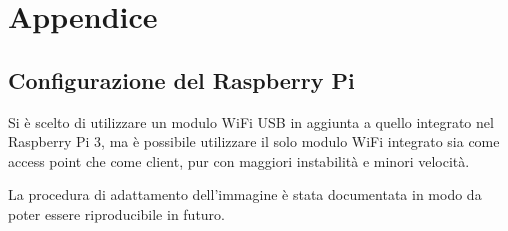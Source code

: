 \appendix

\renewcommand{\thesection}{\Alph{section}}
\renewcommand{\thesubsection}{A.\arabic{subsection}}

\section*{Appendice}



\subsection{Configurazione del Raspberry Pi}\label{app:raspi}

Si è scelto di utilizzare un modulo WiFi USB in aggiunta a quello integrato nel Raspberry Pi 3,
ma è possibile utilizzare il solo modulo WiFi integrato sia come access point che come client, pur con maggiori instabilità e minori velocità.

La procedura di adattamento dell'immagine è stata documentata in modo da poter essere riproducibile in futuro.

